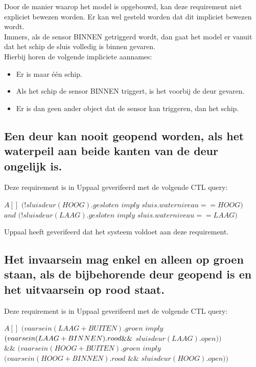 \documentclass{article} %
\begin{document}
Door de manier waarop het model is opgebouwd, kan deze requirement niet expliciet bewezen worden. Er kan wel gesteld worden dat dit impliciet bewezen wordt. \\
Immers, als de sensor BINNEN getriggerd wordt, dan gaat het model er vanuit dat het schip de sluis volledig is binnen gevaren. \\
Hierbij horen de volgende impliciete aannames:
\begin{itemize}
    \item Er is maar één schip.
    \item Als het schip de sensor BINNEN triggert, is het voorbij de deur gevaren.
    \item Er is dan geen ander object dat de sensor kan triggeren, dan het schip.
\end{itemize}

\subsection{Een deur kan nooit geopend worden, als het waterpeil aan beide kanten van de deur ongelijk is.}

Deze requirement is in Uppaal geverifeerd met de volgende CTL query:

\begin{boxA}
    $A[]$ $(!sluisdeur(HOOG).gesloten$ $imply$ $sluis.waterniveau==HOOG)$ \\ $ and$ $(!sluisdeur(LAAG).gesloten $ $imply$ $sluis.waterniveau==LAAG)$
\end{boxA}

Uppaal heeft geverifeerd dat het systeem voldoet aan deze requirement.

\subsection{Het invaarsein mag enkel en alleen op groen staan, als de bijbehorende deur geopend is en het uitvaarsein op rood staat.}

Deze requirement is in Uppaal geverifeerd met de volgende CTL query:

\begin{boxA}
    $A[]$ $(vaarsein(LAAG + BUITEN).groen$ $imply$ $(vaarsein(LAAG + BINNEN).rood \\ \&\& $ $sluisdeur(LAAG).open))$ \\ $\&\& $ $(vaarsein(HOOG + BUITEN).groen$ $imply$ $(vaarsein(HOOG + BINNEN).rood$ $\&\& $ $sluisdeur(HOOG).open))$
\end{boxA}
\end{document}
